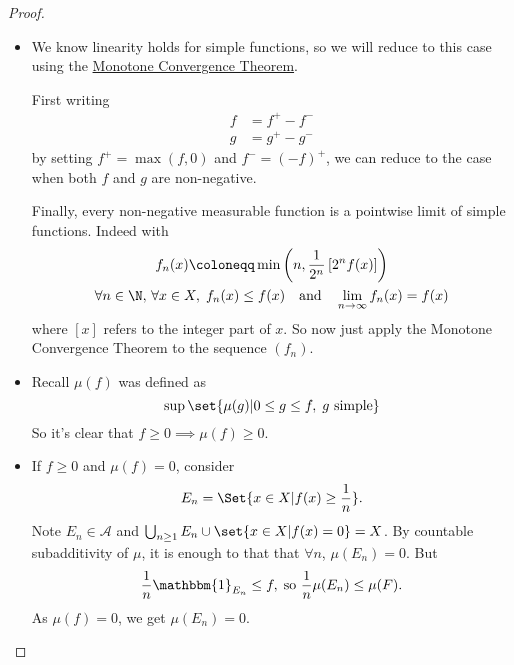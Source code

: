 \documentclass{article}
\newcommand{\1}[1]{\mathbbm{1}_{#1}}
\begin{document}
\begin{proof}
    \leavevmode
    \begin{itemize}
        \item We know linearity holds for simple functions, so we will reduce to this case using the \hyperlink{def:monConv}{Monotone Convergence Theorem}.

            First writing
            \begin{align*}
                f &= f^+ - f^- \\
                g &= g^+ - g^-
            \end{align*}
            by setting $f^+ = \max(f, 0)$ and $f^- = (-f)^+$, we can reduce to the case when both $f$ and $g$ are non-negative.

            Finally, every non-negative measurable function is a pointwise limit of simple functions. Indeed with
            \begin{gather*}
                f_n(x) \coloneqq \min\left(n, \frac{1}{2^n} \left[2^n f(x)\right]\right) \\
                \forall n \in \N, \, \forall x \in X, \; f_n(x) \leq f(x) \quad \text{and} \quad \lim_{n \to \infty} f_n(x) = f(x)
            \end{gather*}
            where $[x]$ refers to the integer part of $x$.
            So now just apply the Monotone Convergence Theorem to the sequence $(f_n)$.

        \item Recall $\mu(f)$ was defined as
            \begin{equation*}
                \sup\set{\mu(g) | 0 \leq g \leq f, \; g \ \text{simple}}
            \end{equation*}
            So it's clear that $f \geq 0 \implies \mu(f) \geq 0$.
        \item If $f \geq 0$ and $\mu(f) = 0$, consider
            \begin{equation*}
                E_n = \Set{x \in X| f(x) \geq \frac{1}{n}}.
            \end{equation*}
            Note $E_n \in \mathcal{A}$ and $\bigcup_{n \geq 1} E_n \cup \set{x \in X | f(x) = 0} = X$.
            By countable subadditivity of $\mu$, it is enough to that that $\forall n$, $\mu(E_n) = 0$. But
            \begin{equation*}
                \frac{1}{n} \1{{E_n}} \leq f, \; \text{so} \ \frac{1}{n} \mu(E_n) \leq \mu(F).
            \end{equation*}
            As $\mu(f) = 0$, we get $\mu(E_n) = 0$. \qedhere
    \end{itemize}
\end{proof}
\end{document}
